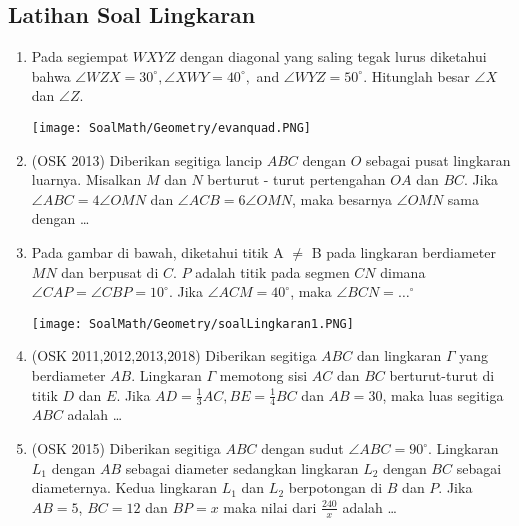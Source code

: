 \subsection{Latihan Soal Lingkaran}
\begin{enumerate}
    \item Pada segiempat $WXYZ$ dengan diagonal yang saling tegak lurus diketahui bahwa $\angle WZX = 30^\circ, \angle XWY = 40^\circ,$ and $\angle WYZ = 50^\circ$. Hitunglah besar $\angle X$ dan $\angle Z$.
    \begin{center}
        \texttt{[image: SoalMath/Geometry/evanquad.PNG]}
    \end{center}
		
    \item (OSK 2013) Diberikan segitiga lancip $ABC$ dengan $O$ sebagai pusat lingkaran luarnya. Misalkan $M$ dan $N$ berturut - turut pertengahan $OA$ dan $BC$. Jika $\angle ABC = 4\angle OMN$ dan $\angle ACB = 6\angle OMN$, maka besarnya $\angle OMN$ sama dengan \dots

    \item 	Pada gambar di bawah, diketahui titik A $\ne$ B pada lingkaran berdiameter $MN$ dan berpusat di $C$. $P$ adalah titik pada segmen $CN$ dimana $\angle CAP = \angle CBP = 10 ^\circ$. Jika $\angle ACM = 40^\circ$, maka $\angle BCN = \dots^\circ$	
    \begin{center}
         \texttt{[image: SoalMath/Geometry/soalLingkaran1.PNG]}
    \end{center}

    \item (OSK 2011,2012,2013,2018) Diberikan segitiga $ABC$ dan lingkaran $\Gamma$ yang berdiameter $AB$. Lingkaran $\Gamma$ memotong sisi $AC$ dan $BC$ berturut-turut di titik $D$ dan $E$. Jika $AD = \frac13 AC, BE =\frac14 BC$ dan $AB = 30$, maka luas segitiga $ABC$ adalah \dots

    \item (OSK 2015) Diberikan segitiga $ABC$ dengan sudut $\angle ABC = 90^\circ$. Lingkaran $L_1$ dengan $AB$ sebagai diameter sedangkan lingkaran $L_2$ dengan $BC$ sebagai diameternya. Kedua lingkaran $L_1$ dan $L_2$ berpotongan di $B$ dan $P$. Jika $AB = 5$, $BC = 12$ dan $BP = x$ maka nilai dari $\frac{240}{x}$ adalah \ldots
\end{enumerate}